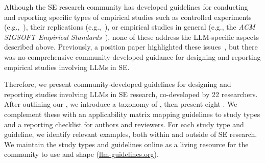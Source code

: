 Although the SE research community has developed guidelines for conducting and reporting specific types of empirical studies such as controlled experiments (e.g.,~\cite{DBLP:books/sp/WohlinRHORW24, DBLP:books/sp/08/SSS2008}), their replications (e.g.,~\cite{DBLP:journals/tse/SantosVOJ21}), or empirical studies in general (e.g., the \emph{ACM SIGSOFT Empirical Standards}~\cite{ralph2021empiricalstandardssoftwareengineering}), none of these address the LLM-specific aspects described above.
Previously, a position paper highlighted these issues~\cite{DBLP:conf/wsese/0001BFB25}, but there was no comprehensive community-developed guidance for designing and reporting empirical studies involving LLMs in SE.

Therefore, we present community-developed guidelines for designing and reporting studies involving LLMs in SE research, co-developed by 22 researchers.
After outlining our \scope, we introduce a taxonomy of \studytypes, then present eight \guidelines.
We complement these with an applicability matrix mapping guidelines to study types and a reporting checklist for authors and reviewers.
For each study type and guideline, we identify relevant examples, both within and outside of SE research.
We maintain the study types and guidelines online as a living resource for the community to use and shape (\href{https://llm-guidelines.org/}{llm-guidelines.org}).
